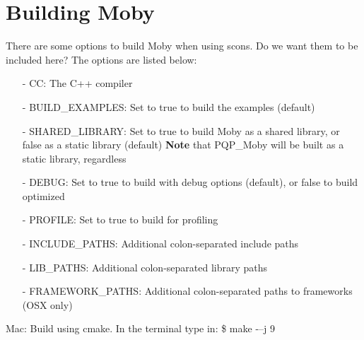 \documentclass[11pt, letterpaper]{article}
\begin{document}
\section{Building Moby}
\begin{em}
There are some options to build Moby when using scons. Do we want them to be included here? The options are listed below:
\begin{enumerate}
\item[-] CC: The C++ compiler

\item[-] BUILD\_EXAMPLES: Set to true to build the examples (default)

\item[-] SHARED\_LIBRARY: Set to true to build Moby as a shared library, or false as a static library (default)
\newline
{\bfseries Note} that PQP\_Moby will be built as a static library, regardless

\item[-] DEBUG: Set to true to build with debug options (default), or false to build optimized

\item[-] PROFILE: Set to true to build for profiling

\item[-] INCLUDE\_PATHS: Additional colon-separated include paths

\item[-] LIB\_PATHS: Additional colon-separated library paths

\item[-] FRAMEWORK\_PATHS: Additional colon-separated paths to frameworks (OSX only)
\end{enumerate}
\end{em}

Mac: Build using cmake. In the terminal type in: \$ make -–j 9
\end{document}
